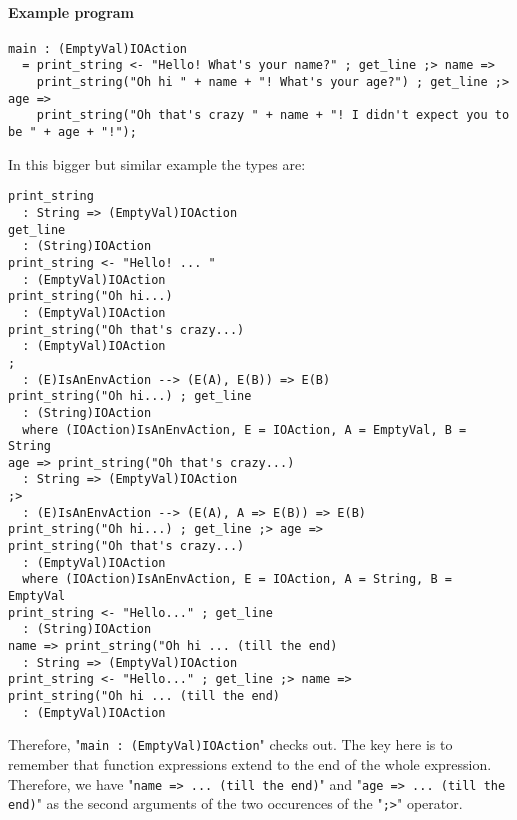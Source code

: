 \documentclass{article}
\begin{document}
\paragraph{Example program}
\begin{verbatim}
main : (EmptyVal)IOAction
  = print_string <- "Hello! What's your name?" ; get_line ;> name =>
    print_string("Oh hi " + name + "! What's your age?") ; get_line ;> age =>
    print_string("Oh that's crazy " + name + "! I didn't expect you to be " + age + "!");
\end{verbatim}
In this bigger but similar example the types are:
\begin{verbatim}
print_string
  : String => (EmptyVal)IOAction
get_line
  : (String)IOAction
print_string <- "Hello! ... "
  : (EmptyVal)IOAction
print_string("Oh hi...)
  : (EmptyVal)IOAction
print_string("Oh that's crazy...)
  : (EmptyVal)IOAction
;
  : (E)IsAnEnvAction --> (E(A), E(B)) => E(B) 
print_string("Oh hi...) ; get_line
  : (String)IOAction
  where (IOAction)IsAnEnvAction, E = IOAction, A = EmptyVal, B = String
age => print_string("Oh that's crazy...)
  : String => (EmptyVal)IOAction
;>
  : (E)IsAnEnvAction --> (E(A), A => E(B)) => E(B) 
print_string("Oh hi...) ; get_line ;> age =>
print_string("Oh that's crazy...)
  : (EmptyVal)IOAction
  where (IOAction)IsAnEnvAction, E = IOAction, A = String, B = EmptyVal
print_string <- "Hello..." ; get_line
  : (String)IOAction
name => print_string("Oh hi ... (till the end)
  : String => (EmptyVal)IOAction
print_string <- "Hello..." ; get_line ;> name =>
print_string("Oh hi ... (till the end)
  : (EmptyVal)IOAction
\end{verbatim}
Therefore, "\texttt{main\ :\ (EmptyVal)IOAction}" checks out.  The key here is
to remember that function expressions extend to the end of the whole
expression. Therefore, we have "\texttt{name => ... (till the end)}" and
"\texttt{age => ... (till the end)}" as the second arguments of the two
occurences of the "\texttt{;>}" operator. 
\end{document}
